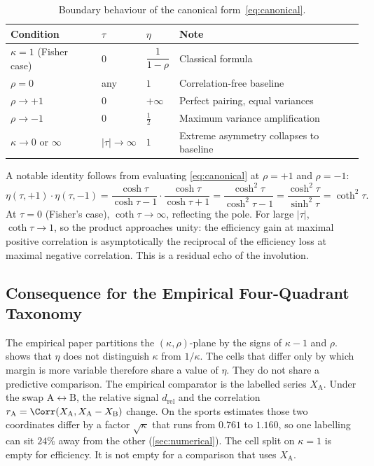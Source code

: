 \begin{table}[t]
  \centering
  \caption{Boundary behaviour of the canonical form~\cref{eq:canonical}.}
  \label{tab:special_values}
  \begin{tabular}{@{}llll@{}}
    \toprule
    \textbf{Condition} & \textbf{$\tau$} & $\eta$ & \textbf{Note} \\
    \midrule
    $\kappa = 1$ (Fisher case) & $0$ & $\dfrac{1}{1-\rho}$ & Classical formula \\[6pt]
    $\rho = 0$                 & any & $1$                   & Correlation-free baseline \\[2pt]
    $\rho \to +1$              & $0$ & $+\infty$             & Perfect pairing, equal variances \\[2pt]
    $\rho \to -1$              & $0$ & $\tfrac{1}{2}$        & Maximum variance amplification \\[2pt]
    $\kappa \to 0$ or $\infty$ & $|\tau| \to \infty$ & $1$ & Extreme asymmetry collapses to baseline \\
    \bottomrule
  \end{tabular}
\end{table}

A notable identity follows from evaluating \cref{eq:canonical} at $\rho = +1$ and $\rho = -1$:
\begin{equation}
  \eta(\tau,+1)\cdot\eta(\tau,-1)
  = \frac{\cosh\tau}{\cosh\tau-1}\cdot\frac{\cosh\tau}{\cosh\tau+1}
  = \frac{\cosh^{2}\tau}{\cosh^{2}\tau-1}
  = \frac{\cosh^{2}\tau}{\sinh^{2}\tau}
  = \coth^{2}\tau.
  \label{eq:reciprocal_product}
\end{equation}
At $\tau = 0$ (Fisher's case), $\coth\tau \to \infty$, reflecting the pole.  For large $|\tau|$, $\coth\tau \to 1$, so the product approaches unity: the efficiency gain at maximal positive correlation is asymptotically the reciprocal of the efficiency loss at maximal negative correlation.  This is a residual echo of the involution.

\subsection{Consequence for the Empirical Four-Quadrant Taxonomy}
\label{sec:quadrant_coverage}

The empirical paper partitions the $(\kappa,\rho)$-plane by the signs of $\kappa-1$ and $\rho$.
 shows that $\eta$ does not distinguish $\kappa$ from $1/\kappa$.
The cells that differ only by which margin is more variable therefore share a value of $\eta$.
They do not share a predictive comparison.
The empirical comparator is the labelled series $X_{\mathrm{A}}$.
Under the swap $\mathrm{A}\leftrightarrow\mathrm{B}$, the relative signal $d_{\mathrm{rel}}$ and the correlation $r_{\mathrm{A}} = \Corr(X_{\mathrm{A}},X_{\mathrm{A}}-X_{\mathrm{B}})$ change.
On the sports estimates those two coordinates differ by a factor $\sqrt{\kappa}$ that runs from $0.761$ to $1.160$, so one labelling can sit $24\%$ away from the other (\cref{sec:numerical}).
The cell split on $\kappa=1$ is empty for efficiency.
It is not empty for a comparison that uses $X_{\mathrm{A}}$.
